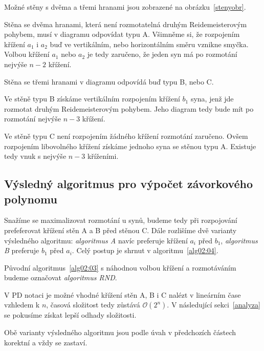 Možné stěny s dvěma a třemi hranami jsou zobrazené na obrázku~\ref{stenyobr}.

Stěna se dvěma hranami, která není rozmotatelná druhým Reidemeisterovým pohybem, musí v diagramu odpovídat typu A. Všimněme si, že rozpojením křížení $a_1$ i $a_2$ buď ve vertikálním, nebo horizontálním směru vznikne smyčka. Volbou křížení $a_1$ nebo $a_2$ je tedy zaručeno, že jeden syn má po rozmotání nejvýše $n-2$ křížení.

Stěna se třemi hranami v diagramu odpovídá buď typu B, nebo C.

Ve stěně typu B získáme vertikálním rozpojením křížení $b_1$ syna, jenž jde rozmotat druhým Reidemeisterovým pohybem. Jeho diagram tedy bude mít po rozmotání nejvýše $n-3$ křížení.

Ve stěně typu C není rozpojením žádného křížení rozmotání zaručeno. Ovšem rozpojením libovolného křížení získáme jednoho syna se stěnou typu A. Existuje tedy vnuk s nejvýše $n-3$ kříženími.

\subsection{Výsledný algoritmus pro výpočet závorkového polynomu} \label{varianty}
Snažíme se maximalizovat rozmotání u synů, budeme tedy při rozpojování prefeferovat křížení stěn A a B před stěnou C. Dále rozlišíme dvě varianty výsledného algoritmu: \emph{algoritmus A} navíc preferuje křížení $a_i$ před $b_1$,  \emph{algoritmus B} preferuje $b_1$ před $a_i$. Celý postup je shrnut v algoritmu~\ref{alg02:04}.

Původní algoritmus~\ref{alg02:03} s náhodnou volbou křížení a rozmotáváním budeme označovat \emph{algoritmus RND}.

V PD notaci je možné vhodné křížení stěn A, B i C nalézt v lineárním čase vzhledem k $n$, časová složitost tedy zůstává $\mathcal{O}(2^n)$. V následující sekci~\ref{analyza} se pokusíme získat lepší odhady složitosti.

Obě varianty výsledného algoritmu jsou podle úvah v předchozích částech korektní a vždy se zastaví.

